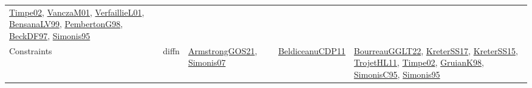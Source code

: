 {\begin{longtable}{lp{3cm}>{\raggedright}p{6cm}>{\raggedright}p{6cm}p{8cm}}
\href{articles/Timpe02.pdf}{Timpe02}\cite{Timpe02}, \href{papers/VanczaM01.pdf}{VanczaM01}\cite{VanczaM01}, \href{papers/VerfaillieL01.pdf}{VerfaillieL01}\cite{VerfaillieL01}, \href{articles/BensanaLV99.pdf}{BensanaLV99}\cite{BensanaLV99}, \href{papers/PembertonG98.pdf}{PembertonG98}\cite{PembertonG98}, \href{papers/BeckDF97.pdf}{BeckDF97}\cite{BeckDF97}, \href{papers/Simonis95.pdf}{Simonis95}\cite{Simonis95}\\
Constraints & diffn & \href{papers/ArmstrongGOS21.pdf}{ArmstrongGOS21}\cite{ArmstrongGOS21}, \href{articles/Simonis07.pdf}{Simonis07}\cite{Simonis07} & \href{articles/BeldiceanuCDP11.pdf}{BeldiceanuCDP11}\cite{BeldiceanuCDP11} & \href{articles/BourreauGGLT22.pdf}{BourreauGGLT22}\cite{BourreauGGLT22}, \href{articles/KreterSS17.pdf}{KreterSS17}\cite{KreterSS17}, \href{papers/KreterSS15.pdf}{KreterSS15}\cite{KreterSS15}, \href{articles/TrojetHL11.pdf}{TrojetHL11}\cite{TrojetHL11}, \href{articles/Timpe02.pdf}{Timpe02}\cite{Timpe02}, \href{papers/GruianK98.pdf}{GruianK98}\cite{GruianK98}, \href{papers/SimonisC95.pdf}{SimonisC95}\cite{SimonisC95}, \href{papers/Simonis95.pdf}{Simonis95}\cite{Simonis95}\\

\end{longtable}}
